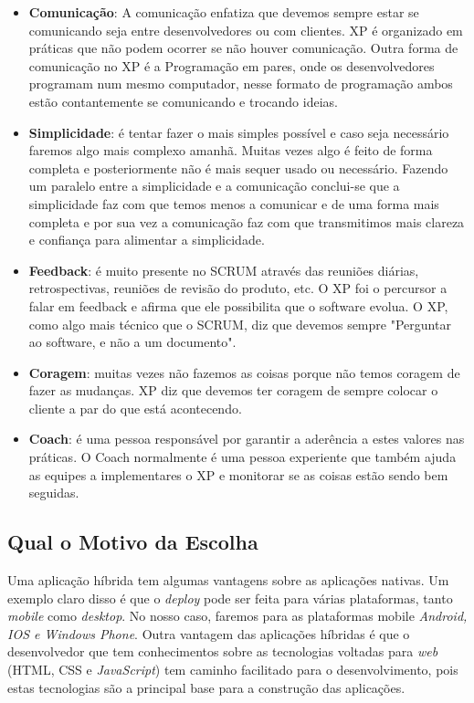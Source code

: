 \documentclass[
	article,			%
	11pt,				%
	oneside,			%
	a4paper,			%
	english,			%
	brazil,				%
	sumario=tradicional
	]{abntex2}
\begin{document}
\begin{itemize}
	\item \textbf{Comunicação}: A comunicação enfatiza que devemos sempre estar se comunicando seja entre desenvolvedores ou com clientes. XP é organizado em práticas que não podem ocorrer se não houver comunicação. Outra forma de comunicação no XP é a Programação em pares, onde os desenvolvedores programam num mesmo computador, nesse formato de programação ambos estão contantemente se comunicando e trocando ideias.
	
	\item \textbf{Simplicidade}: é tentar fazer o mais simples possível e caso seja necessário faremos algo mais complexo amanhã. Muitas vezes algo é feito de forma completa e posteriormente não é mais sequer usado ou necessário.
	Fazendo um paralelo entre a simplicidade e a comunicação conclui-se que a simplicidade faz com que temos menos a comunicar e de uma forma mais completa e por sua vez a comunicação faz com que transmitimos mais clareza e confiança para alimentar a simplicidade.
	
	\item \textbf{Feedback}: é muito presente no SCRUM através das reuniões diárias, retrospectivas, reuniões de revisão do produto, etc. O XP foi o percursor a falar em feedback e afirma que ele possibilita que o software evolua. O XP, como algo mais técnico que o SCRUM, diz que devemos sempre "Perguntar ao software, e não a um documento".
	
	\item \textbf{Coragem}: muitas vezes não fazemos as coisas porque não temos coragem de fazer as mudanças. XP diz que devemos ter coragem de sempre colocar o cliente a par do que está acontecendo.
	
	\item \textbf{Coach}: é uma pessoa responsável por garantir a aderência a estes valores nas práticas. O Coach normalmente é uma pessoa experiente que também ajuda as equipes a implementares o XP e monitorar se as coisas estão sendo bem seguidas.
\end{itemize}

\subsection{Qual o Motivo da Escolha}

Uma aplicação híbrida tem algumas vantagens sobre as aplicações nativas. Um exemplo claro disso é que o \textit{deploy} pode ser feita para várias plataformas, tanto \textit{mobile} como \textit{desktop}. No nosso caso, faremos para as plataformas mobile\textit{ Android, IOS e Windows Phone}. Outra vantagem das aplicações híbridas é que o desenvolvedor que tem conhecimentos sobre as tecnologias voltadas para \textit{web} (HTML, CSS e \textit{JavaScript}) tem caminho facilitado para o desenvolvimento, pois estas tecnologias são a principal base para a construção das aplicações.
\end{document}
